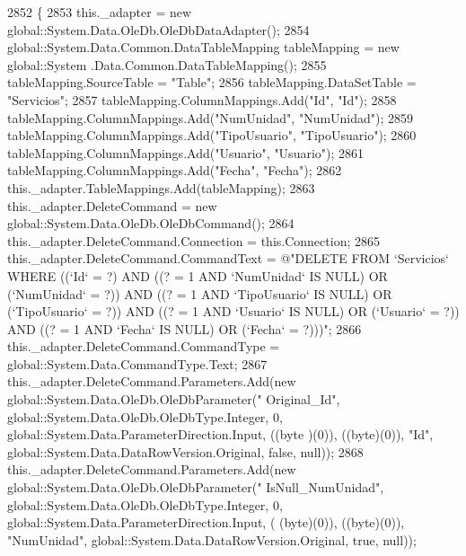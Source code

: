\begin{DoxyCode}
2852                                    \{
2853             this.\_adapter = \textcolor{keyword}{new} global::System.Data.OleDb.OleDbDataAdapter();
2854             global::System.Data.Common.DataTableMapping tableMapping = \textcolor{keyword}{new} global::System
      .Data.Common.DataTableMapping();
2855             tableMapping.SourceTable = \textcolor{stringliteral}{"Table"};
2856             tableMapping.DataSetTable = \textcolor{stringliteral}{"Servicios"};
2857             tableMapping.ColumnMappings.Add(\textcolor{stringliteral}{"Id"}, \textcolor{stringliteral}{"Id"});
2858             tableMapping.ColumnMappings.Add(\textcolor{stringliteral}{"NumUnidad"}, \textcolor{stringliteral}{"NumUnidad"});
2859             tableMapping.ColumnMappings.Add(\textcolor{stringliteral}{"TipoUsuario"}, \textcolor{stringliteral}{"TipoUsuario"});
2860             tableMapping.ColumnMappings.Add(\textcolor{stringliteral}{"Usuario"}, \textcolor{stringliteral}{"Usuario"});
2861             tableMapping.ColumnMappings.Add(\textcolor{stringliteral}{"Fecha"}, \textcolor{stringliteral}{"Fecha"});
2862             this.\_adapter.TableMappings.Add(tableMapping);
2863             this.\_adapter.DeleteCommand = \textcolor{keyword}{new} global::System.Data.OleDb.OleDbCommand();
2864             this.\_adapter.DeleteCommand.Connection = this.Connection;
2865             this.\_adapter.DeleteCommand.CommandText = \textcolor{stringliteral}{@"DELETE FROM `Servicios` WHERE ((`Id` = ?) AND ((? =
       1 AND `NumUnidad` IS NULL) OR (`NumUnidad` = ?)) AND ((? = 1 AND `TipoUsuario` IS NULL) OR (`TipoUsuario` =
       ?)) AND ((? = 1 AND `Usuario` IS NULL) OR (`Usuario` = ?)) AND ((? = 1 AND `Fecha` IS NULL) OR (`Fecha` =
       ?)))"};
2866             this.\_adapter.DeleteCommand.CommandType = global::System.Data.CommandType.Text;
2867             this.\_adapter.DeleteCommand.Parameters.Add(\textcolor{keyword}{new} global::System.Data.OleDb.OleDbParameter(\textcolor{stringliteral}{"
      Original\_Id"}, global::System.Data.OleDb.OleDbType.Integer, 0, global::System.Data.ParameterDirection.Input, ((byte
      )(0)), ((byte)(0)), \textcolor{stringliteral}{"Id"}, global::System.Data.DataRowVersion.Original, \textcolor{keyword}{false}, null));
2868             this.\_adapter.DeleteCommand.Parameters.Add(\textcolor{keyword}{new} global::System.Data.OleDb.OleDbParameter(\textcolor{stringliteral}{"
      IsNull\_NumUnidad"}, global::System.Data.OleDb.OleDbType.Integer, 0, global::System.Data.ParameterDirection.Input, (
      (byte)(0)), ((byte)(0)), \textcolor{stringliteral}{"NumUnidad"}, global::System.Data.DataRowVersion.Original, \textcolor{keyword}{true}, null));

\end{DoxyCode}
